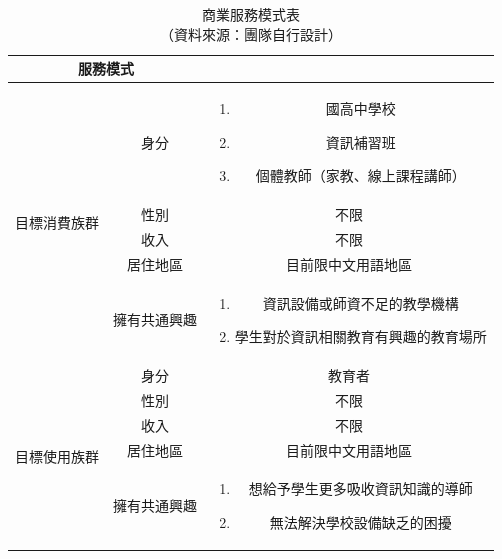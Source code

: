 \begin{table}[H]
  \centering
  \begin{tabular}{|c|c|c|}
    \hline
    \multicolumn{2}{|c|}{服務模式} & \\
    \hline
    \multirow{5}{*}[-0.5ex]{目標消費族群} & 身分 & 
    \begin{minipage}[c]{0.5\columnwidth}
      \vspace{0.3em}
      \begin{enumerate}[label=(\arabic*)]
        \setlength{\parindent}{1em}
        \item 國高中學校
        \item 資訊補習班
        \item 個體教師（家教、線上課程講師）
      \end{enumerate}
      \vspace{0.05em}
    \end{minipage} \\
    \cline{2-3}
    ~ & 性別 & 不限 \\
    \cline{2-3}
    ~ & 收入 & 不限 \\
    \cline{2-3}
    ~ & 居住地區 & 目前限中文用語地區 \\
    \cline{2-3}
    ~ & 擁有共通興趣 &
    \begin{minipage}[c]{0.5\columnwidth}
      \vspace{0.3em}
      \begin{enumerate}[label=(\arabic*)]
        \setlength{\parindent}{1em}
        \item 資訊設備或師資不足的教學機構
        \item 學生對於資訊相關教育有興趣的教育場所
      \end{enumerate}
      \vspace{0.05em}
    \end{minipage} \\
    \hline
    \multirow{5}{*}[-0.5ex]{目標使用族群} & 身分 & 教育者 \\
    \cline{2-3}
    ~ & 性別 & 不限 \\
    \cline{2-3}
    ~ & 收入 & 不限 \\
    \cline{2-3}
    ~ & 居住地區 & 目前限中文用語地區 \\
    \cline{2-3}
    ~ & 擁有共通興趣 & 
      \begin{minipage}[c]{0.5\columnwidth}
        \vspace{0.3em}
        \begin{enumerate}[label=(\arabic*)]
          \setlength{\parindent}{2em}
          \item 想給予學生更多吸收資訊知識的導師
          \item 無法解決學校設備缺乏的困擾
        \end{enumerate}
        \vspace{0.05em}
      \end{minipage} \\
    \hline
  \end{tabular}
  \caption[商業服務模式表]{商業服務模式表 \\（資料來源：團隊自行設計）}
\end{table}
\newpage
